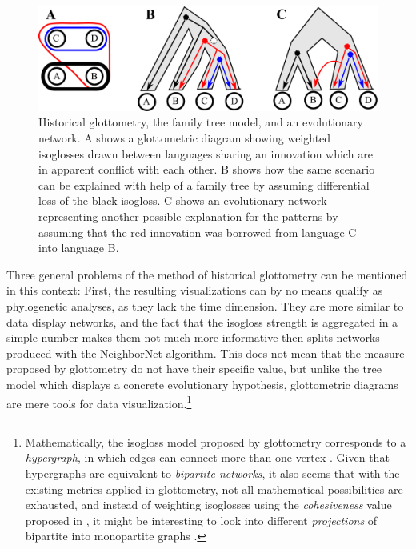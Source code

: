 \documentclass[svgnames,12pt]{scrartcl}
\begin{document}
{{\begin{figure}[htb]
  \centering
  \includegraphics[width=1\textwidth]{images/glottometrie.pdf}
  \caption{Historical glottometry, the family tree model, and an evolutionary network. A shows a glottometric diagram showing
  weighted isoglosses drawn between languages sharing an innovation which are in apparent conflict
  with each other. B shows how the same scenario can be explained with help of a family tree by
  assuming differential loss of the black isogloss. C shows an evolutionary network representing
  another possible explanation for the patterns by assuming that the red innovation was borrowed
  from language C into language B.}
  \label{fig:glotto}
\end{figure}
 

Three general problems of the method of historical glottometry can be mentioned in this context:
First, the resulting visualizations can by no means qualify as phylogenetic analyses, as they lack
the time dimension. They are more similar to data display networks, and the fact that the isogloss
strength is aggregated in a simple number makes them not much more informative then splits networks
produced with the NeighborNet algorithm. This does not mean that the measure proposed by
glottometry do not have their specific value, but unlike the tree model which displays a concrete
evolutionary hypothesis, glottometric diagrams are mere tools for data visualization.\footnote{Mathematically, the isogloss model proposed by glottometry
corresponds to a \emph{hypergraph}, in which edges can connect more than one vertex
\citep[122f]{Newman2010}. Given that hypergraphs are equivalent to \emph{bipartite networks}, it also seems
that with the existing metrics applied in glottometry, not all mathematical possibilities are
exhausted, and instead of weighting isoglosses using the \emph{cohesiveness} value proposed in
\citep{Francois2015}, it might be interesting to look into different \emph{projections} of bipartite into
monopartite graphs \citep[124f]{Newman2010}.}
 
}}
\end{document}
